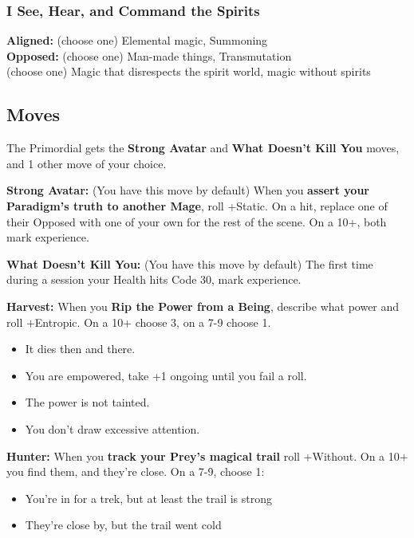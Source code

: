 \documentclass[10pt,twoside,openright]{memoir}
\begin{document}
\hypertarget{i-see-hear-and-command-the-spirits}{%
\subsubsection{I See, Hear, and Command the
Spirits}\label{i-see-hear-and-command-the-spirits}}

\textbf{Aligned:} (choose one) Elemental magic, Summoning\\
\textbf{Opposed:} (choose one) Man-made things, Transmutation\\
(choose one) Magic that disrespects the spirit world, magic without
spirits

\hypertarget{moves-5}{%
\subsection{Moves}\label{moves-5}}

The Primordial gets the \textbf{Strong Avatar} and \textbf{What Doesn't
Kill You} moves, and 1 other move of your choice.

\textbf{Strong Avatar:} (You have this move by default) When you
\textbf{assert your Paradigm's truth to another Mage}, roll +Static. On
a hit, replace one of their Opposed with one of your own for the rest of
the scene. On a 10+, both mark experience.

\textbf{What Doesn't Kill You:} (You have this move by default) The
first time during a session your Health hits Code 30, mark experience.

\textbf{Harvest:} When you \textbf{Rip the Power from a Being}, describe
what power and roll +Entropic. On a 10+ choose 3, on a 7-9 choose 1.

\begin{itemize}
\tightlist
\item
  It dies then and there.
\item
  You are empowered, take +1 ongoing until you fail a roll.
\item
  The power is not tainted.
\item
  You don't draw excessive attention.
\end{itemize}

\textbf{Hunter:} When you \textbf{track your Prey's magical trail} roll
+Without. On a 10+ you find them, and they're close. On a 7-9, choose 1:

\begin{itemize}
\tightlist
\item
  You're in for a trek, but at least the trail is strong
\item
  They're close by, but the trail went cold
\end{itemize}
\end{document}
